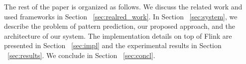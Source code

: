\par The rest of the paper is organized as follows. We discuss the related work and used frameworks in Section ~\ref{sec:realred_work}. In Section ~\ref{sec:system}, we describe the problem of pattern prediction, our proposed approach, and the architecture of our system. The implementation details on top of Flink are presented in Section ~\ref{sec:impl} and the experimental results in Section ~\ref{sec:results}. We conclude in Section ~\ref{sec:concl}.


